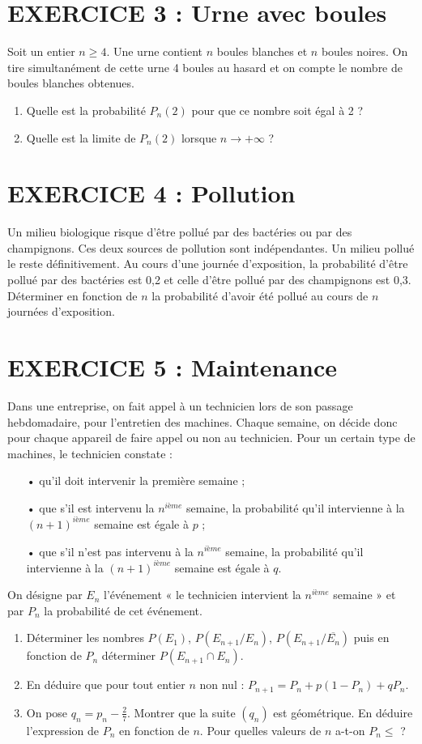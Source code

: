 \documentclass[12pt]{article}
\begin{document}
\section*{EXERCICE 3 : Urne avec boules}
Soit un entier $n \geq 4$. Une urne contient $n$ boules blanches et $n$ boules noires. On tire simultanément de cette urne 4 boules au hasard et on compte le nombre de boules blanches obtenues.
\begin{enumerate}
    \item Quelle est la probabilité $P_n(2)$ pour que ce nombre soit égal à 2 ?
    \item Quelle est la limite de $P_n(2)$ lorsque $n \rightarrow +\infty$ ?
\end{enumerate}

\section*{EXERCICE 4 : Pollution}
Un milieu biologique risque d’être pollué par des bactéries ou par des champignons. Ces deux sources de pollution sont indépendantes. Un milieu pollué le reste définitivement.
Au cours d’une journée d’exposition, la probabilité d’être pollué par des bactéries est 0,2 et celle d’être pollué par des champignons est 0,3.
Déterminer en fonction de $n$ la probabilité d’avoir été pollué au cours de $n$ journées d’exposition.

\section*{EXERCICE 5 : Maintenance}
Dans une entreprise, on fait appel à un technicien lors de son passage hebdomadaire, pour l’entretien des machines.
Chaque semaine, on décide donc pour chaque appareil de faire appel ou non au technicien. Pour un certain type de machines, le technicien constate :
\begin{itemize}
    \item[•] qu'il doit intervenir la première semaine ;
   \item[•] que s'il est intervenu la $n^{ième}$ semaine, la probabilité qu'il intervienne à la $(n+1)^{ième}$ semaine est égale à $p$ ;
    \item[•] que s’il n’est pas intervenu à la $n^{ième}$ semaine, la probabilité qu’il intervienne à la $(n+1)^{ième}$ semaine est égale à $q$.
\end{itemize}
On désigne par $E_n$ l’événement « le technicien intervient la $n^{ième}$ semaine » et par $P_n$ la probabilité de cet événement.
\begin{enumerate}
    \item Déterminer les nombres $P(E_1)$, $P(E_{n+1}/E_n)$, $P(E_{n+1}/\overline{E_n})$ puis en fonction de $P_n$ déterminer $P(E_{n+1} \cap E_n)$.
   \item En déduire que pour tout entier $n$ non nul : $P_{n+1} = P_n + p(1-P_n) + qP_n$.
   \item On pose $q_n = p_n - \frac{2}{7}$. Montrer que la suite $(q_n)$ est géométrique. En déduire l’expression de $P_n$ en fonction de $n$. Pour quelles valeurs de $n$ a-t-on $P_n \leq$ ?
\end{enumerate}
\end{document}

